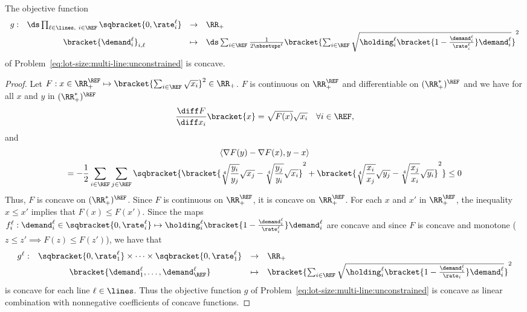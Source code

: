 \begin{prop}\label{lem:concave-objective-function}
The objective function
\begin{equation}
\begin{array}{rccl}
  g: & \ds\prod_{\ell\in\lines,\ i\in\REF} \sqbracket{0,\rate_i^{\ell}} & \to & \RR_+ \\
     & \bracket{\demand_i^{\ell}}_{i,\ell} & \mapsto & \ds\sum_{i\in\REF} \frac{1}{2\nbsetups^{\ell}}\bracket{\sum_{i\in\REF}\sqrt{\holding_i^{\ell}\bracket{1-\frac{\demand_i^{\ell}}{\rate_i^{\ell}}}\demand_i^{\ell}}}^2
\end{array}
\end{equation}
of Problem~\eqref{eq:lot-size:multi-line:unconstrained} is concave.
\end{prop}


\begin{proof}
Let $F: x\in\RR_+^{\REF} \mapsto \bracket{\sum_{i\in\REF} \sqrt{x_i}}^2 \in \RR_+$.
$F$ is continuous on $\RR_+^{\REF}$ and differentiable on $(\RR_+^*)^{\REF}$ and we have for all $x$ and $y$ in $(\RR_+^*)^{\REF}$
\begin{equation}
  \frac{\diff F}{\diff x_i}\bracket{x} = \sqrt{F(x)}\sqrt{x_i} \quad\forall i\in\REF,
\end{equation}
and
\begin{multline}
\left<\nabla F(y)-\nabla F(x),y-x\right>
\\
=
-\frac{1}{2}\sum_{i\in\REF}\sum_{j\in\REF}
\sqbracket
{
  \bracket{ \sqrt[4]{\frac{y_i}{y_j}}\sqrt{x_j} - \sqrt[4]{\frac{y_j}{y_i}}\sqrt{x_i} }^2
  +
  \bracket{ \sqrt[4]{\frac{x_i}{x_j}}\sqrt{y_j} - \sqrt[4]{\frac{x_j}{x_i}}\sqrt{y_i} }^2
}
\le 0
\end{multline}
Thus, $F$ is concave on $(\RR_+^*)^{\REF}$.
Since $F$ is continuous on $\RR_+^{\REF}$, it is concave on $\RR_+^{\REF}$.
For each $x$ and $x'$ in $\RR_+^{\REF}$, the inequality $x\le x'$ implies that $F(x)\le F(x')$.
Since the maps $f_i^{\ell}:\demand_i^{\ell}\in\sqbracket{0,\rate_i^{\ell}}\mapsto\holding_i^{\ell}\bracket{1-\frac{\demand_i^{\ell}}{\rate_i^{\ell}}}\demand_i^{\ell}$ are concave and since $F$ is concave and monotone (\ie $z\le z'\implies F(z)\le F(z')$), we have that
\begin{equation}
\begin{array}{rccl}
  g^{\ell}: & \sqbracket{0,\rate_1^{\ell}}\times\cdots\times\sqbracket{0,\rate_1^{\ell}} & \to     & \RR_+ \\
            & \bracket{\demand_1^{\ell},\ldots,\demand_{\REF}^{\ell}} & \mapsto & \bracket{\sum_{i\in\REF}\sqrt{\holding_i^{\ell}\bracket{1-\frac{\demand_i^{\ell}}{\rate_i}}\demand_i^{\ell}}}^2
\end{array}
\end{equation}
is concave for each line $\ell\in\lines$.
Thus the objective function $g$ of Problem~\eqref{eq:lot-size:multi-line:unconstrained} is concave as linear combination with nonnegative coefficients of concave functions.
\end{proof}



